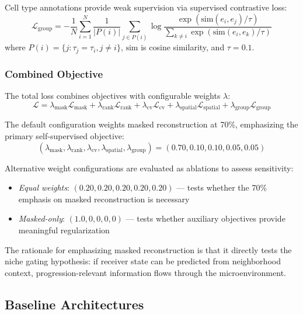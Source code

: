 Cell type annotations provide weak supervision via supervised contrastive loss:
\begin{equation}
    \mathcal{L}_{\text{group}} = -\frac{1}{N} \sum_{i=1}^{N} \frac{1}{|P(i)|} \sum_{j \in P(i)} \log \frac{\exp(\text{sim}(e_i, e_j)/\tau)}{\sum_{k \neq i} \exp(\text{sim}(e_i, e_k)/\tau)}
\end{equation}
where $P(i) = \{j : \tau_j = \tau_i, j \neq i\}$, $\text{sim}$ is cosine similarity, and $\tau = 0.1$.

\subsubsection{Combined Objective}

The total loss combines objectives with configurable weights $\lambda$:
\begin{equation}
    \mathcal{L} = \lambda_{\text{mask}} \mathcal{L}_{\text{mask}} + \lambda_{\text{rank}} \mathcal{L}_{\text{rank}} + \lambda_{\text{cv}} \mathcal{L}_{\text{cv}} + \lambda_{\text{spatial}} \mathcal{L}_{\text{spatial}} + \lambda_{\text{group}} \mathcal{L}_{\text{group}}
\end{equation}

The default configuration weights masked reconstruction at 70\%, emphasizing the primary self-supervised objective:
\begin{equation}
    (\lambda_{\text{mask}}, \lambda_{\text{rank}}, \lambda_{\text{cv}}, \lambda_{\text{spatial}}, \lambda_{\text{group}}) = (0.70, 0.10, 0.10, 0.05, 0.05)
\end{equation}

Alternative weight configurations are evaluated as ablations to assess sensitivity:
\begin{itemize}
    \item \textit{Equal weights}: $(0.20, 0.20, 0.20, 0.20, 0.20)$ --- tests whether the 70\% emphasis on masked reconstruction is necessary
    \item \textit{Masked-only}: $(1.0, 0, 0, 0, 0)$ --- tests whether auxiliary objectives provide meaningful regularization
\end{itemize}
The rationale for emphasizing masked reconstruction is that it directly tests the niche gating hypothesis: if receiver state can be predicted from neighborhood context, progression-relevant information flows through the microenvironment.

\subsection{Baseline Architectures}


